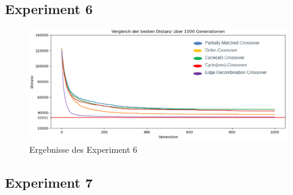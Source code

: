 \subsection{Experiment 6}

\begin{figure}[H]
\centering
\includegraphics[width=1\textwidth]{img/Vortrag/experiment6.png}
\caption{Ergebnisse des Experiment 6}
\label{fig:experiment6}
\end{figure}

\subsection{Experiment 7}

